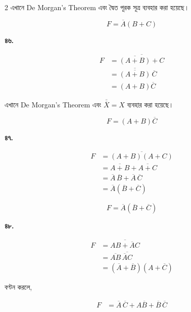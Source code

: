 \begin{multicols}{2}
{\footnotesize
এখানে \textenglish{De Morgan's Theorem}
এবং দ্বৈত পূরক সূত্র ব্যবহার করা হয়েছে।
}

\[
\boxed{F=\overline A(B+C)}
\]

\medskip


\textbf{৪৬.}

\[
\begin{aligned}
F
&=\overline{\overline{(A+B)}+C}\\
&=\overline{\overline{(A+B)}}\,\overline C\\
&=(A+B)\overline C
\end{aligned}
\]

{\footnotesize
এখানে \textenglish{De Morgan's Theorem}
এবং \(\overline{\overline X}=X\) ব্যবহার করা হয়েছে।
}

\[
\boxed{F=(A+B)\overline C}
\]

\medskip


\textbf{৪৭.}

\[
\begin{aligned}
F
&=\overline{(A+B)(A+C)}\\
&=\overline{A+B}+\overline{A+C}\\
&=\overline A\,\overline B
+\overline A\,\overline C\\
&=\overline A(\overline B+\overline C)
\end{aligned}
\]

\[
\boxed{F=\overline A(\overline B+\overline C)}
\]

\medskip


\textbf{৪৮.}

\[
\begin{aligned}
F
&=\overline{AB+\overline AC}\\
&=\overline{AB}\,
\overline{\overline AC}\\
&=(\overline A+\overline B)(A+\overline C)
\end{aligned}
\]

বণ্টন করলে,

\[
\begin{aligned}
F
&=\overline A\,\overline C
+A\overline B
+\overline B\,\overline C
\end{aligned}
\]


\end{multicols}
